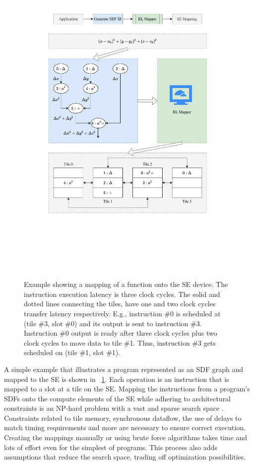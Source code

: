 \begin{figure}
  \centering
  \includegraphics[trim=70 180 70 25, clip, width=0.6\linewidth]{fig/SE_example.pdf}
  \caption{
    Example showing a mapping of a function onto the SE device.
    The instruction execution latency is three clock cycles.
    The solid and dotted lines connecting the tiles, have one and two clock cycles transfer latency respectively.
    E.g., instruction \#0 is scheduled at (tile \#3, slot \#0) and its output is sent to instruction \#3.
    Instruction \#0 output is ready after three clock cycles plus two clock cycles to move data to tile \#1. 
    Thus, instruction \#3 gets scheduled on (tile \#1, slot \#1).
  }
  \label{fig:se_example}
\end{figure}

A simple example that illustrates a program represented as an SDF graph and mapped to the SE is shown in \figurename~\ref{fig:se_example}.
Each operation is an instruction that is mapped to a slot at a tile on the SE.
Mapping the instructions from a program's SDFs onto the compute elements of the SE while adhering to architectural constraints is an NP-hard problem with a vast and sparse search space \cite{10.1007/3-540-69346-7_30}. 
Constraints related to tile memory, synchronous dataflow, the use of delays to match timing requirements and more are necessary to ensure correct execution. 
Creating the mappings manually or using brute force algorithms takes time and lots of effort even for the simplest of programs. 
This process also adds assumptions that reduce the search space, trading off optimization possibilities.  

